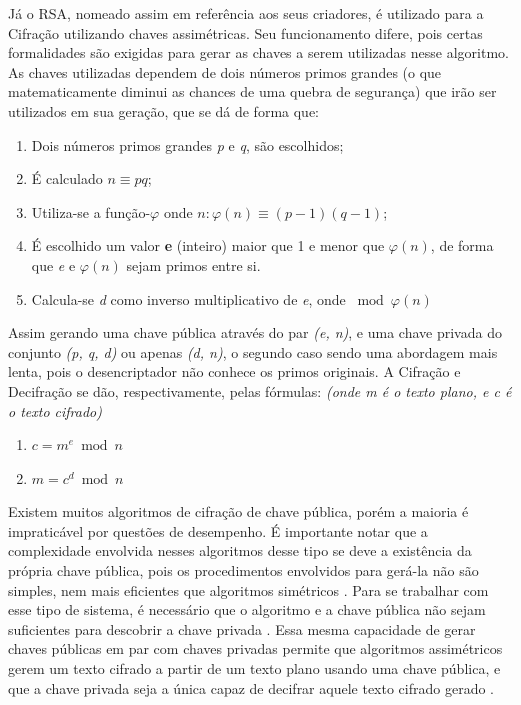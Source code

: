 	Já o RSA, nomeado assim em referência aos seus criadores, é utilizado para a Cifração utilizando chaves assimétricas. Seu funcionamento difere, pois certas formalidades são exigidas para gerar as chaves a serem utilizadas nesse algoritmo. As chaves utilizadas dependem de dois números primos grandes (o que matematicamente diminui as chances de uma quebra de segurança) que irão ser utilizados em sua geração, que se dá de forma que:
	
	\begin{enumerate}
		\item Dois números primos grandes \textit{p} e \textit{q}, são escolhidos;
		\item É calculado $n \equiv pq$;
		\item Utiliza-se a função-$\varphi$ onde $n: \varphi(n) \equiv (p-1)(q-1)$;
		\item É escolhido um valor \textbf{e} (inteiro) maior que 1 e menor que $\varphi(n)$, de forma que \textit{e} e $\varphi(n)$ sejam primos entre si.
		\item Calcula-se \textit{d} como inverso multiplicativo de \textit{e}, onde $\bmod{\varphi(n)}$
	\end{enumerate}
	
	Assim gerando uma chave pública através do par \textit{(e, n)}, e uma chave privada do conjunto \textit{(p, q, d)} ou apenas \textit{(d, n)}, o segundo caso sendo uma abordagem mais lenta, pois o desencriptador não conhece os primos originais. A Cifração e Decifração se dão, respectivamente, pelas fórmulas: \textit{(onde m é o texto plano, e c é o texto cifrado)}
	
	\begin{enumerate}
		\item $c = m^e \bmod{n}$
		\item $m = c^d \bmod{n}$
	\end{enumerate}
	
	Existem muitos algoritmos de cifração de chave pública, porém a maioria é impraticável por questões de desempenho. É importante notar que a complexidade envolvida nesses algoritmos desse tipo se deve a existência da própria chave pública, pois os procedimentos envolvidos para gerá-la não são simples, nem mais eficientes que algoritmos simétricos \cite{stallings11}. Para se trabalhar com esse tipo de sistema, é necessário que o algoritmo e a chave pública não sejam suficientes para descobrir a chave privada \cite{pkcs8}. Essa mesma capacidade de gerar chaves públicas em par com chaves privadas permite que algoritmos assimétricos gerem um texto cifrado a partir de um texto plano usando uma chave pública, e que a chave privada seja a única capaz de decifrar aquele texto cifrado gerado \cite{pkcs1}.
	
